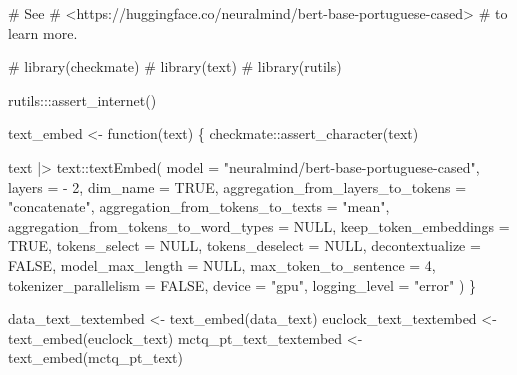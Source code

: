 \documentclass[
  12pt,
  a4paper,
  oneside]{tesesusp}
\newenvironment{Shaded}{\begin{snugshade}}{\end{snugshade}}
\newcommand{\AttributeTok}[1]{\textcolor[rgb]{0.40,0.45,0.13}{#1}}
\newcommand{\CommentTok}[1]{\textcolor[rgb]{0.37,0.37,0.37}{#1}}
\newcommand{\ConstantTok}[1]{\textcolor[rgb]{0.56,0.35,0.01}{#1}}
\newcommand{\ControlFlowTok}[1]{\textcolor[rgb]{0.00,0.23,0.31}{#1}}
\newcommand{\DecValTok}[1]{\textcolor[rgb]{0.68,0.00,0.00}{#1}}
\newcommand{\FunctionTok}[1]{\textcolor[rgb]{0.28,0.35,0.67}{#1}}
\newcommand{\NormalTok}[1]{\textcolor[rgb]{0.00,0.23,0.31}{#1}}
\newcommand{\OtherTok}[1]{\textcolor[rgb]{0.00,0.23,0.31}{#1}}
\newcommand{\SpecialCharTok}[1]{\textcolor[rgb]{0.37,0.37,0.37}{#1}}
\newcommand{\StringTok}[1]{\textcolor[rgb]{0.13,0.47,0.30}{#1}}
\begin{document}
\begin{Shaded}
\begin{Highlighting}[numbers=left,,]
\CommentTok{\# See}
\CommentTok{\# \textless{}https://huggingface.co/neuralmind/bert{-}base{-}portuguese{-}cased\textgreater{}}
\CommentTok{\# to learn more.}

\CommentTok{\# library(checkmate)}
\CommentTok{\# library(text)}
\CommentTok{\# library(rutils)}

\NormalTok{rutils}\SpecialCharTok{:::}\FunctionTok{assert\_internet}\NormalTok{()}

\NormalTok{text\_embed }\OtherTok{\textless{}{-}} \ControlFlowTok{function}\NormalTok{(text) \{}
\NormalTok{  checkmate}\SpecialCharTok{::}\FunctionTok{assert\_character}\NormalTok{(text)}
  
\NormalTok{  text }\SpecialCharTok{|\textgreater{}}
\NormalTok{    text}\SpecialCharTok{::}\FunctionTok{textEmbed}\NormalTok{(}
      \AttributeTok{model =} \StringTok{"neuralmind/bert{-}base{-}portuguese{-}cased"}\NormalTok{,}
      \AttributeTok{layers =} \SpecialCharTok{{-}} \DecValTok{2}\NormalTok{,}
      \AttributeTok{dim\_name =} \ConstantTok{TRUE}\NormalTok{,}
      \AttributeTok{aggregation\_from\_layers\_to\_tokens =} \StringTok{"concatenate"}\NormalTok{,}
      \AttributeTok{aggregation\_from\_tokens\_to\_texts =} \StringTok{"mean"}\NormalTok{,}
      \AttributeTok{aggregation\_from\_tokens\_to\_word\_types =} \ConstantTok{NULL}\NormalTok{,}
      \AttributeTok{keep\_token\_embeddings =} \ConstantTok{TRUE}\NormalTok{,}
      \AttributeTok{tokens\_select =} \ConstantTok{NULL}\NormalTok{,}
      \AttributeTok{tokens\_deselect =} \ConstantTok{NULL}\NormalTok{,}
      \AttributeTok{decontextualize =} \ConstantTok{FALSE}\NormalTok{,}
      \AttributeTok{model\_max\_length =} \ConstantTok{NULL}\NormalTok{,}
      \AttributeTok{max\_token\_to\_sentence =} \DecValTok{4}\NormalTok{,}
      \AttributeTok{tokenizer\_parallelism =} \ConstantTok{FALSE}\NormalTok{,}
      \AttributeTok{device =} \StringTok{"gpu"}\NormalTok{,}
      \AttributeTok{logging\_level =} \StringTok{"error"}
\NormalTok{    )}
\NormalTok{\}}

\NormalTok{data\_text\_textembed }\OtherTok{\textless{}{-}} \FunctionTok{text\_embed}\NormalTok{(data\_text)}
\NormalTok{euclock\_text\_textembed }\OtherTok{\textless{}{-}} \FunctionTok{text\_embed}\NormalTok{(euclock\_text)}
\NormalTok{mctq\_pt\_text\_textembed }\OtherTok{\textless{}{-}} \FunctionTok{text\_embed}\NormalTok{(mctq\_pt\_text)}
\end{Highlighting}
\end{Shaded}
\end{document}
